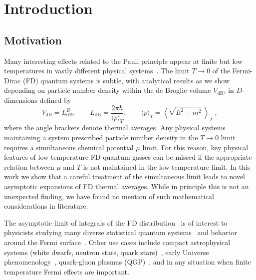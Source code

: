 \documentclass[sn-mathphys,Numbered]{sn-jnl}
\begin{document}

\maketitle
\section{Introduction}\label{Intro}
\subsection{Motivation}\label{Motivation}
Many interesting effects related to the Pauli principle  appear  at finite but low temperatures in vastly different physical systems~\cite{bludman1977equation,Elze:1980er,Ferrer:2019xlr,Kuebler:2021Th}.  The limit  $T\to 0$ of the Fermi-Dirac (FD) quantum systems is subtle, with analytical results as we show depending on particle number density within the de Broglie volume $V_\mathrm{dB}$, in $D$-dimensions defined by
\begin{equation}\label{dBVol}
V_\mathrm{dB}=L_\mathrm{dB}^D, \qquad L_\mathrm{dB}=
\frac{2\pi\hbar}{\langle p\rangle_T},\qquad \langle p\rangle_T=
\left\langle \sqrt{E^2-m^2}\ \right\rangle_T \;,
\end{equation}
 where the angle brackets denote thermal averages. Any  physical systems  maintaining a system prescribed particle number density in the $T\to 0$ limit requires a simultaneous chemical potential $\mu$ limit. For this reason, key physical features of  low-temperature FD quantum gasses   can be missed if the appropriate  relation between $\mu$ and $T$ is not maintained in the low temperature limit.  In this work we show that a careful treatment of the simultaneous limit leads to novel asymptotic expansions of FD thermal averages. While in principle this is not an unexpected finding, we have found no  mention of such mathematical considerations in literature.

The asymptotic limit of integrals of the FD distribution~\cite{dingle1957fermi,dingle1973asymptotic} is of interest to physicists studying many diverse statistical quantum systems~\cite{10.1063/1.1350634,10.1142/S021827180701002X,10.1063/1.1665160,FUKUSHIMA2014417,GIL2022126618,GIL2023108563} and behavior around the Fermi surface~\cite{kim2008notes,PhysRevB.103.205154}. Other use cases include compact astrophysical systems (white dwarfs, neutron stars, quark stars)~\cite{Kaspi:2017fwg,Ferrer:2019xlr,Ferrer:2023pgq}, early Universe phenomenology~\cite{Rafelski:2021aey,Rafelski:2023emw,Grayson:2023flr,Steinmetz:2023nsc}, quark-gluon plasmas (QGP)~\cite{Elze:1980er,Letessier:2002ony,Rafelski:2020ajx,Yang:2021bko}, and in any situation when finite temperature Fermi effects are important. 
\end{document}
